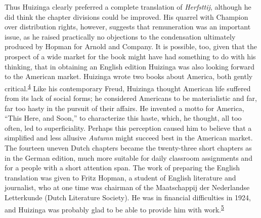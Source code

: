 Thus Huizinga clearly preferred a complete translation of
\emph{Herfsttij}, although he did think the chapter divisions could be
improved. His quarrel with Champion over distribution rights, however,
suggests that remuneration was an important issue, as he raised
practically no objections to the condensation ultimately produced by
Hopman for Arnold and Company. It is possible, too, given that the
prospect of a wide market for the book might have had something to do
with his thinking, that in obtaining an English edition Huizinga was
also looking forward to the American market. Huizinga wrote two books
about America, both gently
critical.\textsuperscript{\protect\hypertarget{05_TRANSLATOR_S_INTRODUCTION.xhtmlux5cux23id_2241}{\protect\hyperlink{23_NOTES.xhtmlux5cux23id_2242}{4}}}
Like his contemporary Freud, Huizinga thought American life suffered
from its lack of social forms; he considered Americans to be
materialistic and far, far too hasty in the pursuit of their affairs. He
invented a motto for America, ``This Here, and Soon,'' to characterize
this haste, which, he thought, all too often, led to superficiality.
Perhaps this perception caused him to believe that a simplified and less
allusive \emph{Autumn} might succeed best in the American market. The
fourteen uneven Dutch chapters became the twenty-three short chapters as
in the German edition, much more suitable for daily classroom
assignments and for a people with a short attention span. The work of
preparing the English translation was given to Fritz Hopman, a student
of English literature and journalist, who at one time was chairman of
the Maatschappij der Nederlandse Letterkunde (Dutch Literature Society).
He was in financial difficulties in 1924, and Huizinga was probably glad
to be able to provide him with
work.\textsuperscript{\protect\hypertarget{05_TRANSLATOR_S_INTRODUCTION.xhtmlux5cux23id_2239}{\protect\hyperlink{23_NOTES.xhtmlux5cux23id_2240}{5}}}


